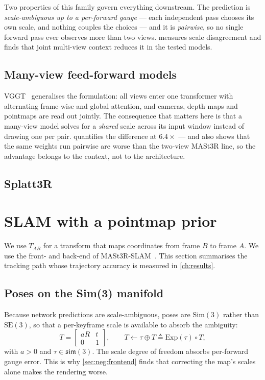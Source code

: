 Two properties of this family govern everything downstream. The prediction is
\emph{scale-ambiguous up to a per-forward gauge} --- each independent pass
chooses its own scale, and nothing couples the choices --- and it is
\emph{pairwise}, so no single forward pass ever observes more than two views.
 measures scale disagreement and finds that joint
multi-view context reduces it in the tested models.

\subsection{Many-view feed-forward models}

VGGT~\cite{wang2025vggt} generalises the formulation: all views enter one
transformer with alternating frame-wise and global attention, and cameras,
depth maps and pointmaps are read out jointly. The consequence that matters
here is that a many-view model solves for a \emph{shared} scale across its
input window instead of drawing one per pair. 
quantifies the difference at $6.4\times$ --- and also shows that the same
weights run pairwise are worse than the two-view MASt3R line, so the advantage
belongs to the context, not to the architecture.

\subsection{Splatt3R}



\section{SLAM with a pointmap prior}
\label{sec:bg:slam}

We use $T_{AB}$ for a transform that maps coordinates from frame $B$ to
frame $A$. We use the front- and back-end of
MASt3R-SLAM~\cite{murai2025mast3rslam}. This section summarises the tracking
path whose trajectory accuracy is measured in \cref{ch:results}.

\subsection{Poses on the Sim(3) manifold}

Because network predictions are scale-ambiguous, poses are $\mathrm{Sim}(3)$
rather than $\mathrm{SE}(3)$, so that a per-keyframe scale is available to
absorb the ambiguity:
\begin{equation}
T=\begin{bmatrix} aR & t\\ 0 & 1\end{bmatrix},\qquad
T \leftarrow \tau \oplus T \triangleq \mathrm{Exp}(\tau)\circ T ,
\label{eq:sim3}
\end{equation}
with $a>0$ and $\tau\in\mathfrak{sim}(3)$. The scale degree of freedom
absorbs per-forward gauge error. This is why
\cref{sec:neg:frontend} finds that correcting the map's scales alone makes the
rendering worse.

